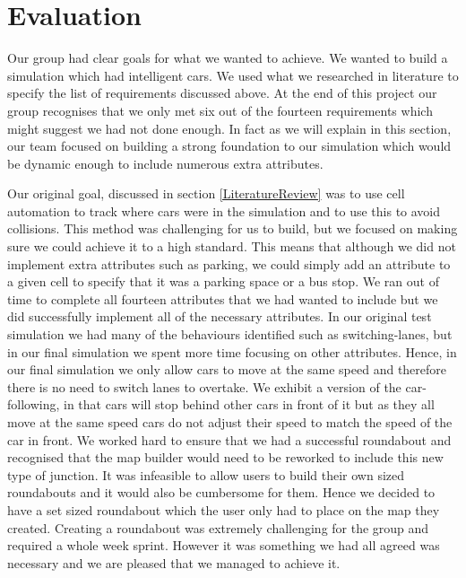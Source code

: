 \documentclass{article}
\begin{document}
	\section{Evaluation}
	Our group had clear goals for what we wanted to achieve. We wanted to build a simulation which had intelligent cars. We used what we researched in literature to specify the list of requirements discussed above. At the end of this project our group recognises that we only met six out of the fourteen requirements which might suggest we had not done enough. In fact as we will explain in this section, our team focused on building a strong foundation to our simulation which would be dynamic enough to include numerous extra attributes. 
	
	Our original goal, discussed in section \ref{LiteratureReview} was to use cell automation to track where cars were in the simulation and to use this to avoid collisions. This method was challenging for us to build, but we focused on making sure we could achieve it to a high standard. This means that although we did not implement extra attributes such as parking, we could simply add an attribute to a given cell to specify that it was a parking space or a bus stop. We ran out of time to complete all fourteen attributes that we had wanted to include but we did successfully implement all of the necessary attributes. In our original test simulation we had many of the behaviours identified \cite{ehlert2001microscopic} such as switching-lanes, but in our final simulation we spent more time focusing on other attributes. Hence, in our final simulation we only allow cars to move at the same speed and therefore there is no need to switch lanes to overtake. We exhibit a version of the car-following, in that cars will stop behind other cars in front of it but as they all move at the same speed cars do not adjust their speed to match the speed of the car in front. We worked hard to ensure that we had a successful roundabout and recognised that the map builder would need to be reworked to include this new type of junction. It was infeasible to allow users to build their own sized roundabouts and it would also be cumbersome for them. Hence we decided to have a set sized roundabout which the user only had to place on the map they created. Creating a roundabout was extremely challenging for the group and required a whole week sprint. However it was something we had all agreed was necessary and we are pleased that we managed to achieve it.
	
\end{document}
